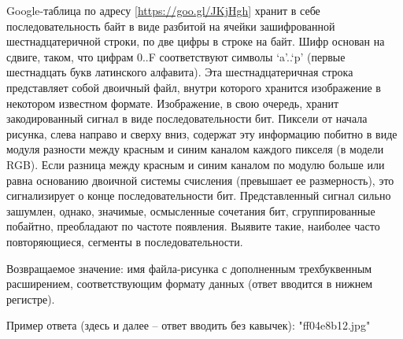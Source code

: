 
Google-таблица по адресу [\url{https://goo.gl/JKjHgh}] хранит в себе последовательность байт в 
виде разбитой на ячейки зашифрованной шестнадцатеричной строки, по две цифры в строке на байт. 
Шифр основан на сдвиге, таком, что цифрам 0..F соответствуют символы ‘a’..‘p’ 
(первые шестнадцать букв латинского алфавита). Эта шестнадцатеричная строка 
представляет собой двоичный файл, внутри которого хранится изображение в некотором 
известном формате. Изображение, в свою очередь, хранит закодированный сигнал в виде 
последовательности бит. Пиксели от начала рисунка, слева направо и сверху вниз, 
содержат эту информацию побитно в виде модуля разности между красным и синим каналом 
каждого пикселя (в модели RGB). Если разница между красным и синим каналом по модулю 
больше или равна основанию двоичной системы счисления (превышает ее размерность), 
это сигнализирует о конце последовательности бит. Представленный сигнал сильно зашумлен, 
однако, значимые, осмысленные сочетания бит, сгруппированные побайтно, преобладают по 
частоте появления. Выявите такие, наиболее часто повторяющиеся, сегменты в последовательности.

Возвращаемое значение: имя файла-рисунка с дополненным трехбуквенным расширением, соответствующим формату данных (ответ вводится в нижнем регистре).

Пример ответа (здесь и далее – ответ вводить без кавычек): "ff04e8b12.jpg"

